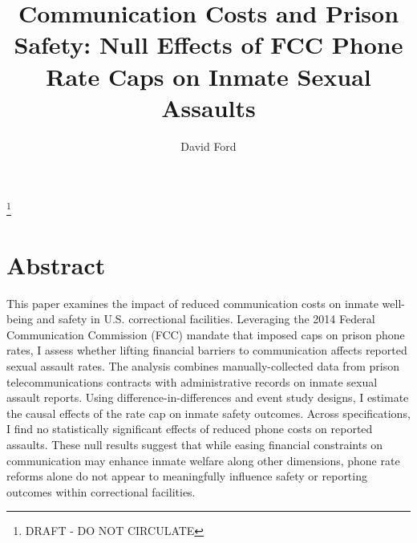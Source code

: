 \documentclass[12pt,a4paper]{article}
\begin{document}
\title{Communication Costs and Prison Safety: Null Effects of FCC Phone Rate Caps on Inmate Sexual Assaults}
\author{David Ford}
\maketitle
\footnote{DRAFT - DO NOT CIRCULATE} \\

\section{Abstract}
This paper examines the impact of reduced communication costs on inmate well-being and safety in U.S. correctional facilities. Leveraging the 2014 Federal Communication Commission (FCC) mandate that imposed caps on prison phone rates, I assess whether lifting financial barriers to communication affects reported sexual assault rates. The analysis combines manually-collected data from prison telecommunications contracts with administrative records on inmate sexual assault reports. Using difference-in-differences and event study designs, I estimate the causal effects of the rate cap on inmate safety outcomes. Across specifications, I find no statistically significant effects of reduced phone costs on reported assaults. These null results suggest that while easing financial constraints on communication may enhance inmate welfare along other dimensions, phone rate reforms alone do not appear to meaningfully influence safety or reporting outcomes within correctional facilities. \\


\graphicspath{{C:/Users/david/coding/01_PRISON_PHONE_paper/6000_LaTeX/}}
\end{document}
